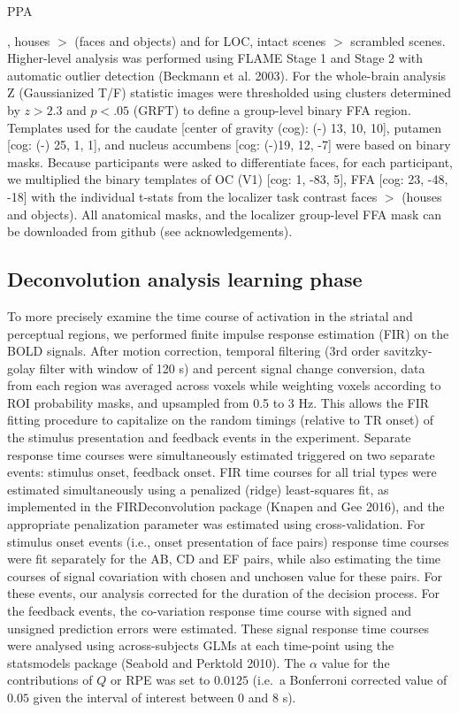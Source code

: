 \documentclass[]{article}
\begin{document}
\begin{shaded}PPA\end{shaded}

, houses \(>\) (faces and objects) and for LOC, intact scenes \(>\)
scrambled scenes. Higher-level analysis was performed using FLAME Stage
1 and Stage 2 with automatic outlier detection (Beckmann et al. 2003).
For the whole-brain analysis Z (Gaussianized T/F) statistic images were
thresholded using clusters determined by \(z > 2.3\) and \(p < .05\)
(GRFT) to define a group-level binary FFA region. Templates used for the
caudate {[}center of gravity (cog): (-) 13, 10, 10{]}, putamen {[}cog:
(-) 25, 1, 1{]}, and nucleus accumbens {[}cog: (-)19, 12, -7{]} were
based on binary masks. Because participants were asked to differentiate
faces, for each participant, we multiplied the binary templates of OC
(V1) {[}cog: 1, -83, 5{]}, FFA {[}cog: 23, -48, -18{]} with the
individual t-stats from the localizer task contrast faces \(>\) (houses
and objects). All anatomical masks, and the localizer group-level FFA
mask can be downloaded from github (see acknowledgements).

\hypertarget{deconvolution-analysis-learning-phase}{%
\subsection{Deconvolution analysis learning
phase}\label{deconvolution-analysis-learning-phase}}

To more precisely examine the time course of activation in the striatal
and perceptual regions, we performed finite impulse response estimation
(FIR) on the BOLD signals. After motion correction, temporal filtering
(3rd order savitzky-golay filter with window of 120 s) and percent
signal change conversion, data from each region was averaged across
voxels while weighting voxels according to ROI probability masks, and
upsampled from 0.5 to 3 Hz. This allows the FIR fitting procedure to
capitalize on the random timings (relative to TR onset) of the stimulus
presentation and feedback events in the experiment. Separate response
time courses were simultaneously estimated triggered on two separate
events: stimulus onset, feedback onset. FIR time courses for all trial
types were estimated simultaneously using a penalized (ridge)
least-squares fit, as implemented in the FIRDeconvolution package
(Knapen and Gee 2016), and the appropriate penalization parameter was
estimated using cross-validation. For stimulus onset events (i.e., onset
presentation of face pairs) response time courses were fit separately
for the AB, CD and EF pairs, while also estimating the time courses of
signal covariation with chosen and unchosen value for these pairs. For
these events, our analysis corrected for the duration of the decision
process. For the feedback events, the co-variation response time course
with signed and unsigned prediction errors were estimated. These signal
response time courses were analysed using across-subjects GLMs at each
time-point using the statsmodels package (Seabold and Perktold 2010).
The \(\alpha\) value for the contributions of \(Q\) or RPE was set to
\(0.0125\) (i.e.~a Bonferroni corrected value of \(0.05\) given the
interval of interest between 0 and 8 s).
\end{document}
